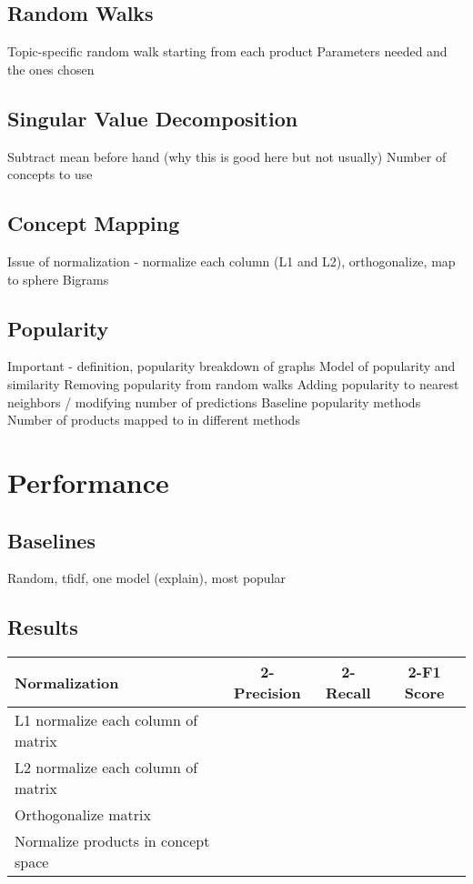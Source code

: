 \documentclass[11pt]{article}
\begin{document}
\subsection*{Random Walks}
Topic-specific random walk starting from each product
Parameters needed and the ones chosen

\subsection*{Singular Value Decomposition}
Subtract mean before hand (why this is good here but not usually)
Number of concepts to use

\subsection*{Concept Mapping}
Issue of normalization - normalize each column (L1 and L2), orthogonalize, map
to sphere
Bigrams

\subsection*{Popularity}
Important - definition, popularity breakdown of graphs
Model of popularity and similarity
Removing popularity from random walks
Adding popularity to nearest neighbors / modifying number of predictions
Baseline popularity methods
Number of products mapped to in different methods

\section*{Performance}
\subsection*{Baselines}
Random, tfidf, one model (explain), most popular

\subsection*{Results}
\begin{center}
\begin{tabular}{ | l | c | c | c |}
\hline
Normalization & 2-Precision & 2-Recall & 2-F1 Score \\ \hline\hline
L1 normalize each column of matrix &&&\\ \hline
L2 normalize each column of matrix &&&\\ \hline
Orthogonalize matrix &&&\\ \hline
Normalize products in concept space &&&\\ \hline
\end{tabular}
\end{center}
\end{document}
